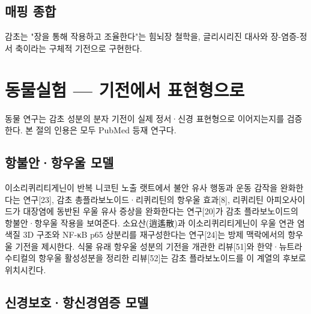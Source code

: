 \documentclass[12pt,oneside]{book}
\begin{document}
\subsection{매핑 종합}

\vspace{2pt}\vspace{3pt}

감초는 "장을 통해 작용하고 조율한다"는 힘뇌장 철학을, 글리시리진 대사와 장-염증-정서 축이라는 구체적 기전으로 구현한다.

\section{동물실험 — 기전에서 표현형으로}

동물 연구는 감초 성분의 분자 기전이 실제 정서·신경 표현형으로 이어지는지를 검증한다. 본 절의 인용은 모두 PubMed 등재 연구다.

\subsection{항불안·항우울 모델}

이소리퀴리티게닌이 반복 니코틴 노출 랫트에서 불안 유사 행동과 운동 감작을 완화한다는 연구[23], 감초 총플라보노이드·리퀴리틴의 항우울 효과[8], 리퀴리틴 아피오사이드가 대장염에 동반된 우울 유사 증상을 완화한다는 연구[20]가 감초 플라보노이드의 항불안·항우울 작용을 보여준다. 소요산(逍遙散)과 이소리퀴리티게닌이 우울 연관 염색질 3D 구조와 NF-κB p65 상분리를 재구성한다는 연구[24]는 방제 맥락에서의 항우울 기전을 제시한다. 식물 유래 항우울 성분의 기전을 개관한 리뷰[51]와 한약·뉴트라수티컬의 항우울 활성성분을 정리한 리뷰[52]는 감초 플라보노이드를 이 계열의 후보로 위치시킨다.

\subsection{신경보호·항신경염증 모델}
\end{document}
